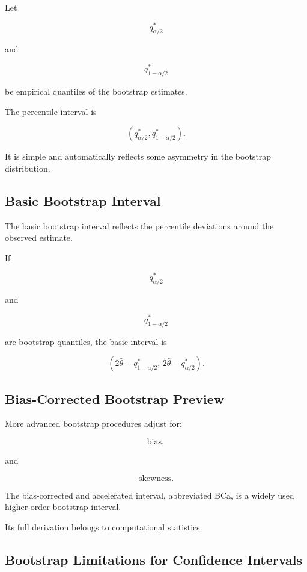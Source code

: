 Let

\[
q_{\alpha/2}^*
\]

and

\[
q_{1-\alpha/2}^*
\]

be empirical quantiles of the bootstrap estimates.

The percentile interval is

\[
\boxed{
\left(
q_{\alpha/2}^*,
q_{1-\alpha/2}^*
\right).
}
\]

It is simple and automatically reflects some asymmetry in the bootstrap
distribution.

\subsection{Basic Bootstrap Interval}
\label{subsec:basic-bootstrap-interval}

The basic bootstrap interval reflects the percentile deviations around
the observed estimate.

If

\[
q_{\alpha/2}^*
\]

and

\[
q_{1-\alpha/2}^*
\]

are bootstrap quantiles, the basic interval is

\[
\boxed{
\left(
2\widehat{\theta}
-
q_{1-\alpha/2}^*,
\,
2\widehat{\theta}
-
q_{\alpha/2}^*
\right).
}
\]

\subsection{Bias-Corrected Bootstrap Preview}
\label{subsec:bca-bootstrap-preview}

More advanced bootstrap procedures adjust for:

\[
\boxed{
\text{bias},
}
\]

and

\[
\boxed{
\text{skewness}.
}
\]

The bias-corrected and accelerated interval, abbreviated BCa, is a widely
used higher-order bootstrap interval.

Its full derivation belongs to computational statistics.

\subsection{Bootstrap Limitations for Confidence Intervals}
\label{subsec:bootstrap-ci-limitations}

